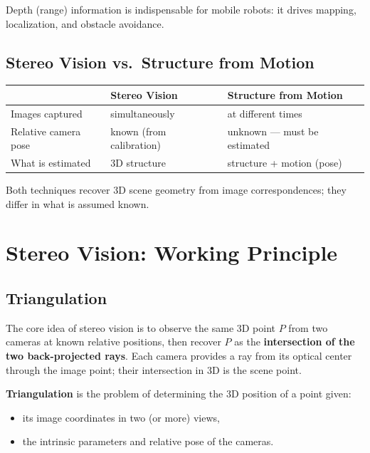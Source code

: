 \documentclass[11pt,a4paper]{article}
\theoremstyle{definition}
\theoremstyle{plain}
\theoremstyle{remark}
\begin{document}
Depth (range) information is indispensable for mobile robots: it drives mapping, localization, and obstacle avoidance.

\subsection{Stereo Vision vs.\ Structure from Motion}

\begin{center}
\begin{tabular}{lll}
\hline
 & \textbf{Stereo Vision} & \textbf{Structure from Motion} \\
\hline
Images captured & simultaneously & at different times \\
Relative camera pose & known (from calibration) & unknown — must be estimated \\
What is estimated & 3D structure & structure + motion (pose) \\
\hline
\end{tabular}
\end{center}

Both techniques recover 3D scene geometry from image correspondences; they differ in what is assumed known.

\section{Stereo Vision: Working Principle}

\subsection{Triangulation}

The core idea of stereo vision is to observe the same 3D point $P$ from two cameras at known relative positions, then recover $P$ as the \textbf{intersection of the two back-projected rays}. Each camera provides a ray from its optical center through the image point; their intersection in 3D is the scene point.

\textbf{Triangulation} is the problem of determining the 3D position of a point given:
\begin{itemize}
    \item its image coordinates in two (or more) views,
    \item the intrinsic parameters and relative pose of the cameras.
\end{itemize}
\end{document}
